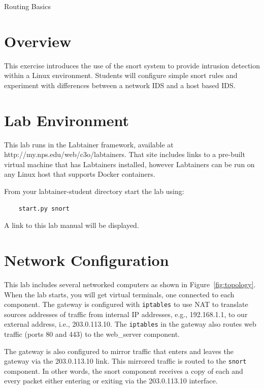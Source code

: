 


\begin{center}
{\LARGE Routing Basics}
\vspace{0.1in}\\
\end{center}

\copyrightnotice

\section{Overview}
This exercise introduces the use of the snort system
to provide intrusion detection within a
Linux environment.  Students will configure simple 
snort rules and experiment with differences between
a network IDS and a host based IDS.  


\section{Lab Environment}
This lab runs in the Labtainer framework,
available at http://my.nps.edu/web/c3o/labtainers.
That site includes links to a pre-built virtual machine
that has Labtainers installed, however Labtainers can
be run on any Linux host that supports Docker containers.

From your labtainer-student directory start the lab using:
\begin{verbatim}
    start.py snort
\end{verbatim}
\noindent A link to this lab manual will be displayed.  

\section{Network Configuration}
This lab includes several networked computers as shown in Figure~\ref{fig:topology}.
When the lab starts, you will get virtual terminals, one connected to each
component.  The gateway is configured with {\tt iptables} to use NAT to translate
sources addresses of traffic from internal IP addresses, e.g., 192.168.1.1, to
our external address, i.e., 203.0.113.10.  The {\tt iptables} in the gateway also
routes web traffic (ports 80 and 443) to the web\_server component.

The gateway is also configured to mirror traffic that enters and leaves the gateway via the 203.0.113.10 link.  This
mirrored traffic is routed to the {\tt snort} component.  In other words, the snort component receives a copy
of each and every packet either entering or exiting via the 203.0.113.10 interface.

